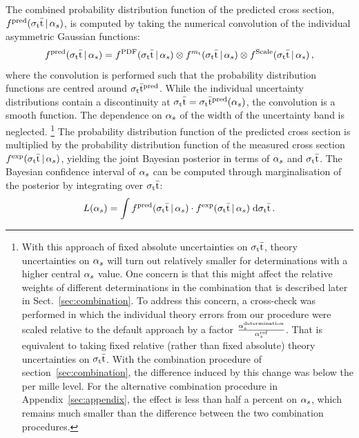 The combined probability distribution function of the predicted cross
section, $f^{\text{pred}}(\sigma_\mathrm{t}\bar{\mathrm{t}}\,|\,\alpha_s)$, is computed by taking the
numerical convolution of the individual asymmetric Gaussian functions:
% 
\begin{equation}
f^{\text{pred}}(\sigma_\mathrm{t}\bar{\mathrm{t}}\,|\,\alpha_s) = 
    f^{\text{PDF}}(\sigma_\mathrm{t}\bar{\mathrm{t}}\,|\,\alpha_s)    \otimes
    f^{m_\mathrm{t}}(\sigma_\mathrm{t}\bar{\mathrm{t}}\,|\,\alpha_s)           \otimes
    f^{\text{Scale}}(\sigma_\mathrm{t}\bar{\mathrm{t}}\,|\,\alpha_s)\,,
\end{equation}
% 
where the convolution is performed such that the probability distribution
functions are centred around $\sigma_\mathrm{t}\bar{\mathrm{t}}^\text{pred}$.
%
While the individual uncertainty distributions contain a discontinuity
at $\sigma_\mathrm{t}\bar{\mathrm{t}} = \sigma_\mathrm{t}\bar{\mathrm{t}}^{\text{pred}}(\alpha_s)$, the convolution is a smooth
function.
%
The dependence on $\alpha_s$ of the width of the uncertainty band is neglected.%
% 
\footnote{ With this approach of fixed absolute uncertainties on $\sigma_\mathrm{t}\bar{\mathrm{t}}$,
    theory uncertainties on $\alpha_s$ will turn out relatively smaller for
    determinations with a higher central $\alpha_s$ value.
    One concern is that this might affect the relative weights of
    different determinations in the combination that is described
    later in Sect.~\ref{sec:combination}.
    To address this concern, a cross-check was performed in which the
    individual theory errors from our procedure were scaled relative
    to the default approach by a factor
    $\frac{ \alpha_s^\text{determination} }{ \alpha_s^\text{ref} }$.
    That is equivalent to taking fixed relative (rather than fixed
    absolute) theory uncertainties on $\sigma_\mathrm{t}\bar{\mathrm{t}}$.
    With the combination procedure of section~\ref{sec:combination},
    the difference induced by this change was below the per mille
    level.
    For the alternative combination procedure in
    Appendix~\ref{sec:appendix}, the effect is less than half a 
    percent on $\alpha_s$, which remains much smaller than the difference
    between the two combination procedures.  }
%
The probability distribution function of the predicted cross section
is multiplied by the probability distribution function of the measured
cross section $f^{\text{exp}}(\sigma_\mathrm{t}\bar{\mathrm{t}}\,|\,\alpha_s)$, yielding the joint
Bayesian posterior in terms of $\alpha_s$ and $\sigma_\mathrm{t}\bar{\mathrm{t}}$. The Bayesian
confidence interval of $\alpha_s$ can be computed through marginalisation
of the posterior by integrating over $\sigma_\mathrm{t}\bar{\mathrm{t}}$:
%
\begin{equation}
  \label{eq:likelihood-master-equation}
  L(\alpha_s) = \int f^{\text{pred}}(\sigma_\mathrm{t}\bar{\mathrm{t}}\,|\,\alpha_s) 
  \cdot 
  f^{\text{exp}}(\sigma_\mathrm{t}\bar{\mathrm{t}}\,|\,\alpha_s) \; \text{d}\sigma_\mathrm{t}\bar{\mathrm{t}}\,.
\end{equation}
